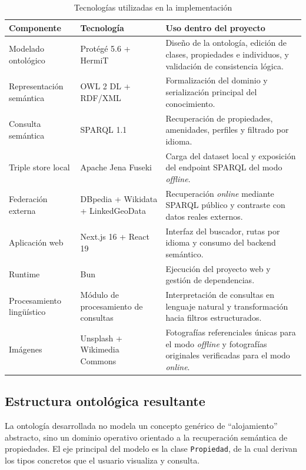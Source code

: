 \begin{table}[H]
\centering
\caption{Tecnologías utilizadas en la implementación}
\begin{tabular}{|p{3.8cm}|p{4.0cm}|p{6.2cm}|}
\hline
\textbf{Componente} & \textbf{Tecnología} & \textbf{Uso dentro del proyecto} \\
\hline
Modelado ontológico & Protégé 5.6 + HermiT & Diseño de la ontología, edición de clases, propiedades e individuos, y validación de consistencia lógica. \\
\hline
Representación semántica & OWL 2 DL + RDF/XML & Formalización del dominio y serialización principal del conocimiento. \\
\hline
Consulta semántica & SPARQL 1.1 & Recuperación de propiedades, amenidades, perfiles y filtrado por idioma. \\
\hline
Triple store local & Apache Jena Fuseki & Carga del dataset local y exposición del endpoint SPARQL del modo \textit{offline}. \\
\hline
Federación externa & DBpedia + Wikidata + LinkedGeoData & Recuperación \textit{online} mediante SPARQL público y contraste con datos reales externos. \\
\hline
Aplicación web & Next.js 16 + React 19 & Interfaz del buscador, rutas por idioma y consumo del backend semántico. \\
\hline
Runtime & Bun & Ejecución del proyecto web y gestión de dependencias. \\
\hline
Procesamiento lingüístico & Módulo de procesamiento de consultas & Interpretación de consultas en lenguaje natural y transformación hacia filtros estructurados. \\
\hline
Imágenes & Unsplash + Wikimedia Commons & Fotografías referenciales únicas para el modo \textit{offline} y fotografías originales verificadas para el modo \textit{online}. \\
\hline
\end{tabular}
\end{table}

\subsection{Estructura ontológica resultante}

La ontología desarrollada no modela un concepto genérico de ``alojamiento'' abstracto,
sino un dominio operativo orientado a la recuperación semántica de propiedades. El eje
principal del modelo es la clase \texttt{Propiedad}, de la cual derivan los tipos
concretos que el usuario visualiza y consulta.

